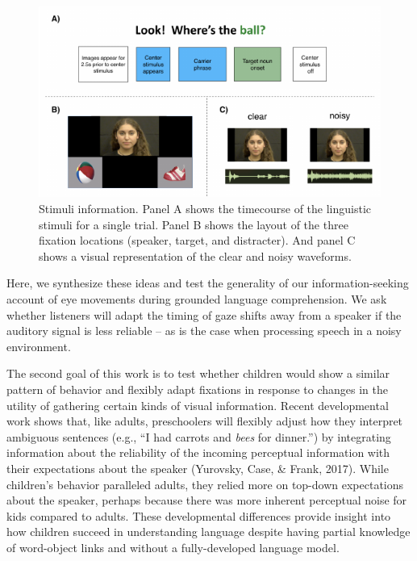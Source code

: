 \documentclass[10pt, letterpaper]{article}
\newenvironment{CodeChunk}{}{}
\begin{document}
\begin{CodeChunk}
\begin{figure}[tb]

{\centering \includegraphics[width=0.8\linewidth]{figs/stimuli_plot-1} 

}

\caption[Stimuli information]{Stimuli information. Panel A shows the timecourse of the linguistic stimuli for a single trial. Panel B shows the layout of the three fixation locations (speaker, target, and distracter). And panel C shows a visual representation of the clear and noisy waveforms.}\label{fig:stimuli_plot}
\end{figure}
\end{CodeChunk}

Here, we synthesize these ideas and test the generality of our
information-seeking account of eye movements during grounded language
comprehension. We ask whether listeners will adapt the timing of gaze
shifts away from a speaker if the auditory signal is less reliable -- as
is the case when processing speech in a noisy environment.

The second goal of this work is to test whether children would show a
similar pattern of behavior and flexibly adapt fixations in response to
changes in the utility of gathering certain kinds of visual information.
Recent developmental work shows that, like adults, preschoolers will
flexibly adjust how they interpret ambiguous sentences (e.g., ``I had
carrots and \emph{bees} for dinner.'') by integrating information about
the reliability of the incoming perceptual information with their
expectations about the speaker (Yurovsky, Case, \& Frank, 2017). While
children's behavior paralleled adults, they relied more on top-down
expectations about the speaker, perhaps because there was more inherent
perceptual noise for kids compared to adults. These developmental
differences provide insight into how children succeed in understanding
language despite having partial knowledge of word-object links and
without a fully-developed language model.
\end{document}
